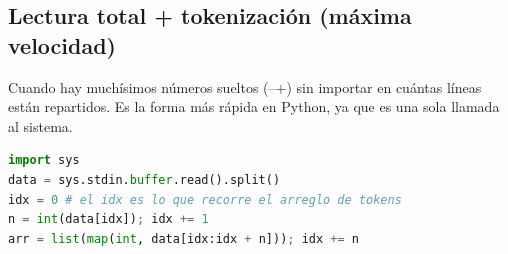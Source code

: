 \subsection{Lectura total + tokenización (máxima velocidad)}
\label{alg:1-2}

Cuando hay muchísimos números sueltos (--+) sin importar en cuántas líneas están repartidos. 
Es la forma más rápida en Python, ya que es una sola llamada al sistema.

\begin{lstlisting}[language=Python]
import sys
data = sys.stdin.buffer.read().split()
idx = 0 # el idx es lo que recorre el arreglo de tokens
n = int(data[idx]); idx += 1
arr = list(map(int, data[idx:idx + n])); idx += n
\end{lstlisting}
